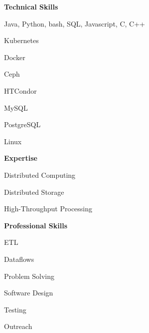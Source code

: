 \documentclass[12pt]{article}
\newcommand{\notexperience}[2]{%
  \medskip
  {\color{colorsection}{#1} {\large \textbf{#2}}}}
\begin{document}
\begin{minipage}[t]{0.29\linewidth}

  \notexperience{\faTasks}{Technical Skills}

  \medskip

  Java, Python, bash, SQL, Javascript, C, C++

  \medskip

  Kubernetes

  \medskip

  Docker

  \medskip

  Ceph

  \medskip

  HTCondor

  \medskip

  MySQL

  \medskip

  PostgreSQL

  \medskip

  Linux

  \bigskip
  \bigskip

  \notexperience{\faUserNinja}{Expertise}

  \medskip
  
  Distributed Computing

  \medskip

  Distributed Storage

  \medskip

  High-Throughput Processing

  \bigskip
  \bigskip

  \notexperience{\faToolbox}{Professional Skills}

  \medskip

  ETL

  \medskip

  Dataflows

  \medskip

  Problem Solving

  \medskip

  Software Design

  \medskip

  Testing
  
  \medskip

  Outreach

\end{minipage}\hfill
\end{document}
